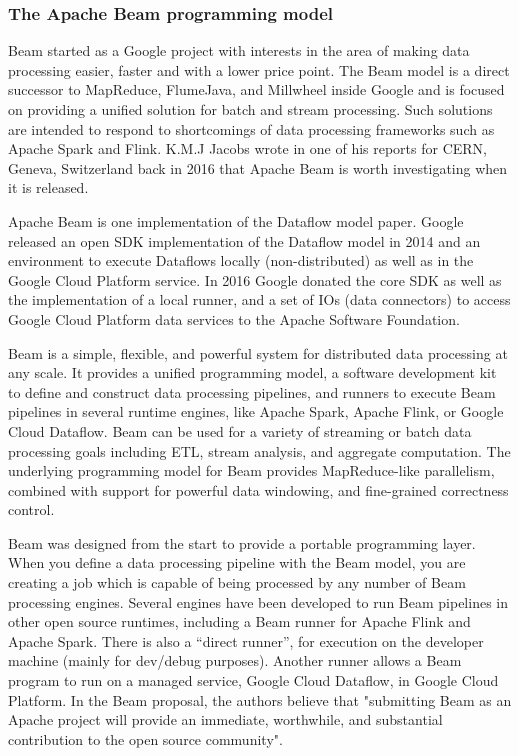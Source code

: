 \subsubsection{The Apache Beam programming model}

Beam started as a Google project with interests in the area of making data processing easier, faster and with a lower price point. The Beam model is a direct successor to MapReduce, FlumeJava, and Millwheel inside Google and is focused on providing a unified solution for batch and stream processing. Such solutions are intended to respond to shortcomings of data processing frameworks such as Apache Spark and Flink. K.M.J Jacobs wrote in one of his reports for CERN, Geneva, Switzerland back in 2016 that Apache Beam is worth investigating when it is released. \cite{7776539} 

Apache Beam is one implementation of the Dataflow model paper. Google released an open SDK implementation of the Dataflow model in 2014 and an environment to execute Dataflows locally (non-distributed) as well as in the Google Cloud Platform service. In 2016 Google donated the core SDK as well as the implementation of a local runner, and a set of IOs (data connectors) to access Google Cloud Platform data services to the Apache Software Foundation.

Beam is a simple, flexible, and powerful system for distributed data processing at any scale. It provides a unified programming model, a software development kit to define and construct data processing pipelines, and runners to execute Beam pipelines in several runtime engines, like Apache Spark, Apache Flink, or Google Cloud Dataflow. Beam can be used for a variety of streaming or batch data processing goals including ETL, stream analysis, and aggregate computation. The underlying programming model for Beam provides MapReduce-like parallelism, combined with support for powerful data windowing, and fine-grained correctness control. \cite{BeamProposal}

Beam was designed from the start to provide a portable programming layer. When you define a data processing pipeline with the Beam model, you are creating a job which is capable of being processed by any number of Beam processing engines. Several engines have been developed to run Beam pipelines in other open source runtimes, including a Beam runner for Apache Flink and Apache Spark. There is also a “direct runner”, for execution on the developer machine (mainly for dev/debug purposes). Another runner allows a Beam program to run on a managed service, Google Cloud Dataflow, in Google Cloud Platform. In the Beam proposal, the authors believe that "submitting Beam as an Apache project will provide an immediate, worthwhile, and substantial contribution to the open source community". \cite{BeamProposal}

